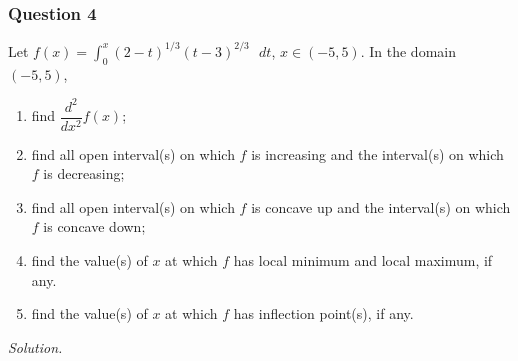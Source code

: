 \documentclass[12pt]{article}
\begin{document}
\subsubsection*{Question 4}
Let $f\left(x\right)=\displaystyle \int_{0}^{x}\left(2-t\right)^{1/3}\left(t-3\right)^{2/3}\text{ }dt$, $x\in \left(-5,5\right)$. In the domain $\left(-5,5\right)$,
\begin{enumerate}[label=\textbf{(\roman*)}]
    \itemsep 0em
    \item find $\dfrac{d^2}{dx^2}f\left(x\right)$;
    \item find all open interval(s) on which $f$ is increasing and the interval(s) on which $f$ is decreasing;
    \item find all open interval(s) on which $f$ is concave up and the interval(s) on which $f$ is concave down;
    \item find the value(s) of $x$ at which $f$ has local minimum and local maximum, if any.
    \item find the value(s) of $x$ at which $f$ has inflection point(s), if any.
\end{enumerate}
\textit{Solution.}
\end{document}
